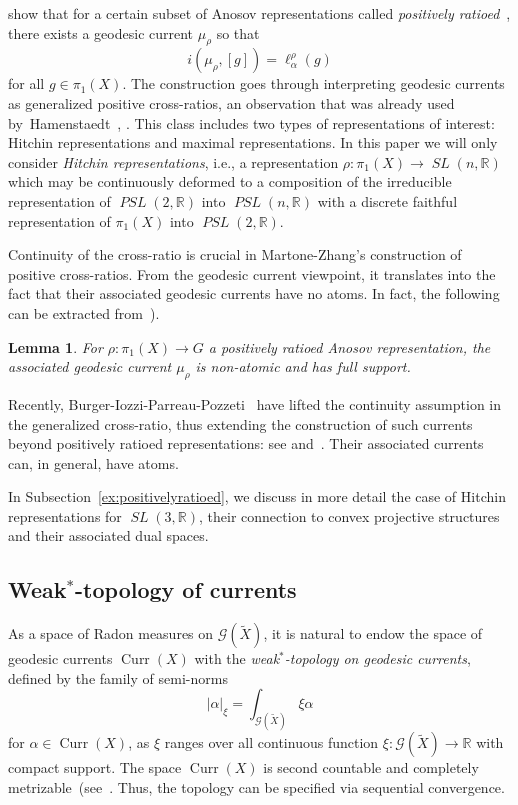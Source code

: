 \documentclass[12pt,article]{amsart}
\numberwithin{equation}{section}
\numberwithin{figure}{section}
\newtheorem{lemma}[equation]{Lemma}
\theoremstyle{definition}
\theoremstyle{plain}
\DeclareMathOperator{\Curr}{Curr}
\newcommand*{\wt}[1]{\widetilde{#1}}
\DeclareMathOperator{\SL}{\mathit{SL}}
\DeclareMathOperator{\PSL}{\mathit{PSL}}
\begin{document}
show that for a certain subset of Anosov representations called \emph{positively ratioed}~\cite[Definition~2.21]{MZ19:PositivelyRatioed}, there exists a geodesic current $\mu_{\rho}$ so that
\[
i(\mu_{\rho},[g])=\ell^{\rho}_{\alpha}(g)
\]
for all $g \in \pi_1(X)$. 
The construction goes through interpreting geodesic currents as generalized positive cross-ratios, an observation that was already used by~Hamenstaedt~\cite[Lemma~1.10]{Ham97:Cocycles}, \cite[Section~2]{Ham99:Cocycles}.
This class includes two types of representations of interest: Hitchin representations and maximal representations. In this paper we will only consider  \emph{Hitchin representations}, i.e., a representation $\rho \colon \pi_1(X) \to \SL(n,\mathbb{R})$ which 
may be continuously deformed to a composition of the irreducible representation of $\PSL(2,\mathbb{R})$ into $\PSL(n,\mathbb{R})$ with a discrete faithful representation of $\pi_1(X)$ into $\PSL(2,\mathbb{R})$.

Continuity of the cross-ratio is crucial in Martone-Zhang's construction of positive cross-ratios.
From the geodesic current viewpoint, it translates into the fact that their associated geodesic currents have no atoms.
In fact, the following can be extracted from~\cite[Page~17]{MZ19:PositivelyRatioed}).

\begin{lemma}
For $\rho \colon \pi_1(X) \to G$ a positively ratioed Anosov representation, the associated geodesic current $\mu_{\rho}$ is non-atomic and has full support.
\label{lem:anosovnoatomfull}
\end{lemma}

Recently, Burger-Iozzi-Parreau-Pozzeti~\cite[Proposition~4.3]{BIPP21:Crossratios} have lifted the continuity assumption in the generalized cross-ratio, 
thus extending the construction of such currents beyond positively ratioed representations: see
\cite{BP21:Hk} and~\cite{BP21:Theta}. Their associated currents can, in general, have atoms.

In Subsection~\ref{ex:positivelyratioed}, we discuss in more detail the case of Hitchin representations for $\SL(3,\mathbb{R})$, their connection to convex projective structures and their associated dual spaces.

\subsection{Weak$^*$-topology of currents}
 \label{subsec:weakstar}
 As a space of Radon measures on $\mathcal{G}(\wt{X})$, it is natural to endow the space of geodesic currents $\Curr(X)$ with the \emph{weak$^*$-topology on geodesic currents}, defined by the family of
semi-norms
\[
| \alpha |_{\xi} = \int_{\mathcal{G}(\wt{X})} \xi \alpha
\]
for $\alpha \in \Curr(X)$, as $\xi$ ranges over all continuous function $\xi \colon \mathcal{G}(\wt{X}) \to  \mathbb{R}$ with compact support.
The space $\Curr(X)$ is second countable and completely metrizable~(see~\cite[Proposition~A.9]{ES22:GeodesicCount}.
Thus, the topology can be specified via sequential convergence.
\end{document}
